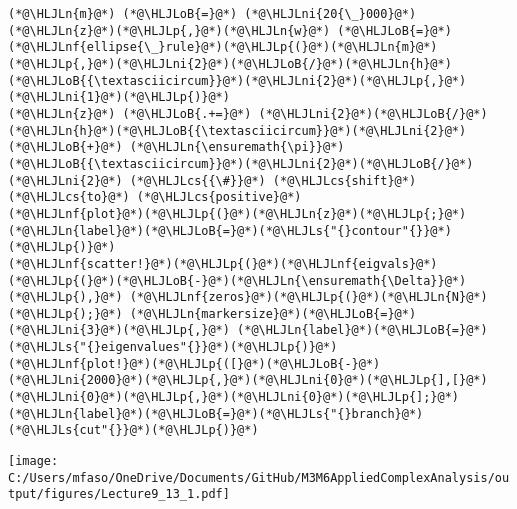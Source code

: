 \documentclass[12pt,a4paper]{article}
\newcommand{\HLJLn}[1]{#1}
\newcommand{\HLJLnf}[1]{\textcolor[RGB]{66,102,213}{#1}}
\newcommand{\HLJLs}[1]{\textcolor[RGB]{201,61,57}{#1}}
\newcommand{\HLJLni}[1]{\textcolor[RGB]{59,151,46}{#1}}
\newcommand{\HLJLoB}[1]{\textcolor[RGB]{102,102,102}{\textbf{#1}}}
\newcommand{\HLJLp}[1]{#1}
\newcommand{\HLJLcs}[1]{\textcolor[RGB]{153,153,119}{\textit{#1}}}
\begin{document}
\begin{lstlisting}
(*@\HLJLn{m}@*) (*@\HLJLoB{=}@*) (*@\HLJLni{20{\_}000}@*)
(*@\HLJLn{z}@*)(*@\HLJLp{,}@*)(*@\HLJLn{w}@*) (*@\HLJLoB{=}@*) (*@\HLJLnf{ellipse{\_}rule}@*)(*@\HLJLp{(}@*)(*@\HLJLn{m}@*)(*@\HLJLp{,}@*)(*@\HLJLni{2}@*)(*@\HLJLoB{/}@*)(*@\HLJLn{h}@*)(*@\HLJLoB{{\textasciicircum}}@*)(*@\HLJLni{2}@*)(*@\HLJLp{,}@*)(*@\HLJLni{1}@*)(*@\HLJLp{)}@*)
(*@\HLJLn{z}@*) (*@\HLJLoB{.+=}@*) (*@\HLJLni{2}@*)(*@\HLJLoB{/}@*)(*@\HLJLn{h}@*)(*@\HLJLoB{{\textasciicircum}}@*)(*@\HLJLni{2}@*) (*@\HLJLoB{+}@*) (*@\HLJLn{\ensuremath{\pi}}@*)(*@\HLJLoB{{\textasciicircum}}@*)(*@\HLJLni{2}@*)(*@\HLJLoB{/}@*)(*@\HLJLni{2}@*) (*@\HLJLcs{{\#}}@*) (*@\HLJLcs{shift}@*) (*@\HLJLcs{to}@*) (*@\HLJLcs{positive}@*)
(*@\HLJLnf{plot}@*)(*@\HLJLp{(}@*)(*@\HLJLn{z}@*)(*@\HLJLp{;}@*) (*@\HLJLn{label}@*)(*@\HLJLoB{=}@*)(*@\HLJLs{"{}contour"{}}@*)(*@\HLJLp{)}@*)
(*@\HLJLnf{scatter!}@*)(*@\HLJLp{(}@*)(*@\HLJLnf{eigvals}@*)(*@\HLJLp{(}@*)(*@\HLJLoB{-}@*)(*@\HLJLn{\ensuremath{\Delta}}@*)(*@\HLJLp{),}@*) (*@\HLJLnf{zeros}@*)(*@\HLJLp{(}@*)(*@\HLJLn{N}@*)(*@\HLJLp{);}@*) (*@\HLJLn{markersize}@*)(*@\HLJLoB{=}@*)(*@\HLJLni{3}@*)(*@\HLJLp{,}@*) (*@\HLJLn{label}@*)(*@\HLJLoB{=}@*)(*@\HLJLs{"{}eigenvalues"{}}@*)(*@\HLJLp{)}@*)
(*@\HLJLnf{plot!}@*)(*@\HLJLp{([}@*)(*@\HLJLoB{-}@*)(*@\HLJLni{2000}@*)(*@\HLJLp{,}@*)(*@\HLJLni{0}@*)(*@\HLJLp{],[}@*)(*@\HLJLni{0}@*)(*@\HLJLp{,}@*)(*@\HLJLni{0}@*)(*@\HLJLp{];}@*) (*@\HLJLn{label}@*)(*@\HLJLoB{=}@*)(*@\HLJLs{"{}branch}@*) (*@\HLJLs{cut"{}}@*)(*@\HLJLp{)}@*)
\end{lstlisting}

\texttt{[image: C:/Users/mfaso/OneDrive/Documents/GitHub/M3M6AppliedComplexAnalysis/output/figures/Lecture9\_13\_1.pdf]}
\end{document}
